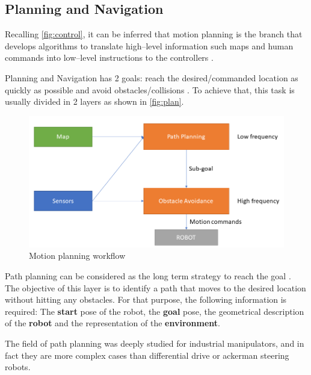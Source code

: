 \subsection{Planning and Navigation}

Recalling \autoref{fig:control}, it can be inferred that motion planning is the branch that develops algorithms to translate high--level information such maps and human commands into low--level instructions to the controllers .

Planning and Navigation has 2 goals: reach the desired/commanded location as quickly as possible and avoid obstacles/collisions . To achieve that, this task is usually divided in 2 layers as shown in \autoref{fig:plan}.

\begin{figure}[htb]
  \centering
  \includegraphics[width=.9\linewidth]{pictures/02/plan}
  \caption{Motion planning workflow}
  \label{fig:plan}
\end{figure} 

 Path planning can be considered as the long term strategy to reach the goal . The objective of this layer is to identify a path that moves to the desired location without hitting any obstacles. For that purpose, the following information is required: The \textbf{start} pose of the robot, the \textbf{goal} pose, the geometrical description of the \textbf{robot} and the representation of the \textbf{environment}. 

The field of path planning was deeply studied for industrial manipulators, and in fact they are more complex cases than differential drive or ackerman steering robots. 


